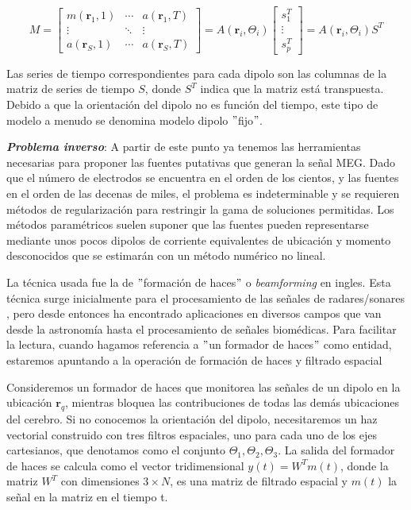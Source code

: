 \documentclass[11pt,letterpaper]{article}
\numberwithin{equation}{subsection}
\numberwithin{table}{subsection}
\begin{document}
\begin{equation}
M=
\begin{bmatrix}
m(\mathbf{r}_1,1)& \cdots  & a(\mathbf{r}_1,T) \\ 
\vdots  & \ddots  & \vdots  \\ 
 a(\mathbf{r}_S,1)& \cdots  & a(\mathbf{r}_S,T) 
\end{bmatrix}
=A(\mathbf{r}_{i},\Theta_i )
\begin{bmatrix}
s_1^T\\ 
\vdots \\ 
s_p^T
\end{bmatrix}
= A(\mathbf{r}_{i},\Theta_i)S^T
\end{equation}

\bigskip
\noindent Las series de tiempo correspondientes para cada dipolo son las columnas de la matriz de series de tiempo $S$, donde $S^T$ indica que la matriz está transpuesta. Debido a que la orientación del dipolo no es función del tiempo, este tipo de modelo a menudo se denomina modelo dipolo $"$fijo$"$.

\bigskip
\noindent \textbf{\textit{Problema inverso}}: A partir de este punto ya tenemos las herramientas necesarias para proponer las fuentes putativas que generan la señal MEG. Dado que el número de electrodos se encuentra en el orden de los cientos, y las fuentes en el orden de las decenas de miles,  el problema es indeterminable y se requieren métodos de regularización para restringir la gama de soluciones permitidas. Los métodos paramétricos suelen suponer que las fuentes pueden representarse mediante unos pocos dipolos de corriente equivalentes de ubicación y momento desconocidos que se estimarán con un método numérico no lineal. 

\bigskip
\noindent La técnica usada fue la de $"$formación de haces$"$ o \textit{beamforming} en ingles. Esta técnica surge inicialmente para el procesamiento de las señales de radares/sonares \cite{van1988beamforming}, pero desde entonces ha encontrado aplicaciones en diversos campos que van desde la astronomía hasta el procesamiento de señales biomédicas. Para facilitar la lectura, cuando hagamos referencia a $"$un formador de haces$"$ como entidad, estaremos apuntando a la operación de formación de haces y filtrado espacial 

\bigskip
\noindent Consideremos un formador de haces que monitorea las señales de un dipolo en la ubicación $\mathbf{r}_q$, mientras bloquea las contribuciones de todas las demás ubicaciones del cerebro. Si no conocemos la orientación del dipolo, necesitaremos un haz vectorial construido con tres filtros espaciales, uno para cada uno de los ejes cartesianos, que denotamos como el conjunto {$\Theta_1, \Theta_2, \Theta_3$}. La salida del formador de haces se calcula como el vector tridimensional $y(t)=W^Tm(t)$, donde la matriz $W^T$ con dimensiones $3 \times N$, es una matriz de filtrado espacial y $m(t)$  la señal en la matriz en el tiempo t.
\end{document}
